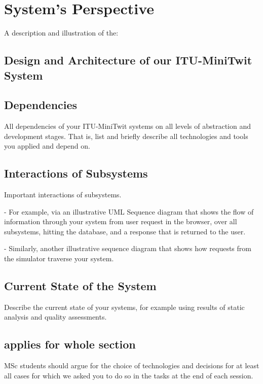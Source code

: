 \section{System's Perspective}
A description and illustration of the:
\subsection{Design and Architecture of our ITU-MiniTwit System}

\subsection{Dependencies}
All dependencies of your ITU-MiniTwit systems on all levels of abstraction and development stages. That is, list and briefly describe all technologies and tools you applied and depend on.

\subsection{Interactions of Subsystems}
Important interactions of subsystems.

- For example, via an illustrative UML Sequence diagram that shows the flow of information through your system from user request in the browser, over all subsystems, hitting the database, and a response that is returned to the user.

- Similarly, another illustrative sequence diagram that shows how requests from the simulator traverse your system.

\subsection{Current State of the System}
Describe the current state of your systems, for example using results of static analysis and quality assessments.


\subsection{applies for whole section}
MSc students should argue for the choice of technologies and decisions for at least all cases for which we asked you to do so in the tasks at the end of each session.
